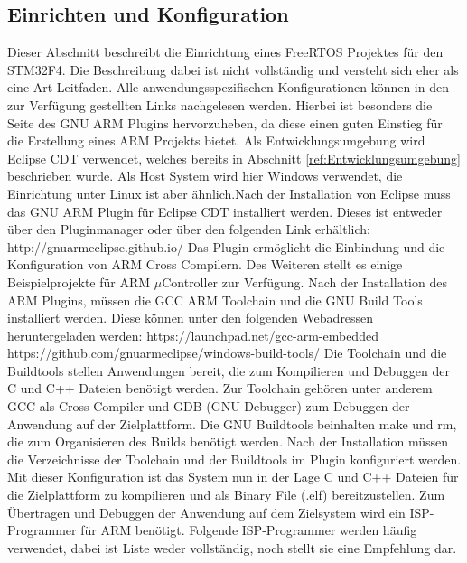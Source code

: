 \subsection{Einrichten und Konfiguration}
\label{sec:Einrichtung und Konfiguration}
Dieser Abschnitt beschreibt die Einrichtung eines FreeRTOS Projektes für den STM32F4. Die Beschreibung dabei ist nicht vollständig und versteht sich eher als eine Art Leitfaden. Alle anwendungsspezifischen Konfigurationen können in den zur Verfügung gestellten Links nachgelesen werden. Hierbei ist besonders die Seite des GNU ARM Plugins hervorzuheben, da diese einen guten Einstieg für die Erstellung eines ARM Projekts bietet. Als Entwicklungsumgebung wird Eclipse CDT verwendet, welches bereits in Abschnitt \ref{ref:Entwicklungsumgebung} beschrieben wurde. Als Host System wird hier Windows verwendet, die Einrichtung unter Linux ist aber ähnlich.Nach der Installation von Eclipse muss das GNU ARM Plugin für Eclipse CDT installiert werden. Dieses ist entweder über den Pluginmanager oder über den folgenden Link erhältlich: 
\newline
\newline
http://gnuarmeclipse.github.io/
\newline
\newline
Das Plugin ermöglicht die Einbindung und die Konfiguration von ARM Cross Compilern. Des Weiteren stellt es einige Beispielprojekte für ARM $\mu$Controller zur Verfügung. Nach der Installation des ARM Plugins, müssen die GCC ARM Toolchain und die GNU Build Tools installiert werden. 
Diese können unter den folgenden Webadressen heruntergeladen werden: 
\newline
\newline
https://launchpad.net/gcc-arm-embedded
\newline
https://github.com/gnuarmeclipse/windows-build-tools/
\newline
\newline
Die Toolchain und die Buildtools stellen Anwendungen bereit, die zum Kompilieren und Debuggen der C und C++ Dateien benötigt werden. Zur Toolchain gehören unter anderem GCC als Cross Compiler und GDB (GNU Debugger) zum Debuggen der Anwendung auf der Zielplattform. Die GNU Buildtools beinhalten make und rm, die zum Organisieren des Builds benötigt werden. Nach der Installation müssen die Verzeichnisse der Toolchain und der Buildtools im Plugin konfiguriert werden. Mit dieser Konfiguration ist das System nun in der Lage C und C++ Dateien für die Zielplattform zu kompilieren und als Binary File (.elf) bereitzustellen. Zum Übertragen und Debuggen der Anwendung auf dem Zielsystem wird ein ISP-Programmer für ARM benötigt. Folgende ISP-Programmer werden häufig verwendet, dabei ist Liste weder vollständig, noch stellt sie eine Empfehlung dar.
